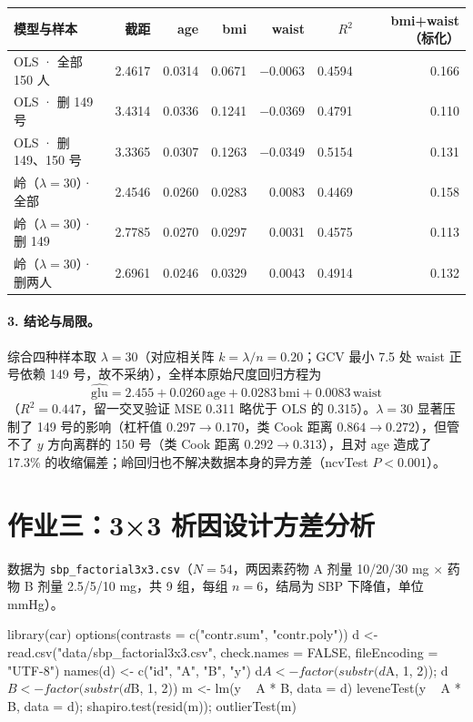 \vspace{0.8em}
\begin{tabular}{lrrrrrr}
\toprule
模型与样本 & 截距 & age & bmi & waist & $R^2$ & bmi+waist（标化）\\
\midrule
OLS · 全部 150 人     & 2.4617 & 0.0314 & 0.0671 & $-0.0063$ & 0.4594 & 0.166\\
OLS · 删 149 号       & 3.4314 & 0.0336 & 0.1241 & $-0.0369$ & 0.4791 & 0.110\\
OLS · 删 149、150 号  & 3.3365 & 0.0307 & 0.1263 & $-0.0349$ & 0.5154 & 0.131\\
\midrule
岭（$\lambda=30$）· 全部 & 2.4546 & 0.0260 & 0.0283 & 0.0083 & 0.4469 & 0.158\\
岭（$\lambda=30$）· 删 149 & 2.7785 & 0.0270 & 0.0297 & 0.0031 & 0.4575 & 0.113\\
岭（$\lambda=30$）· 删两人 & 2.6961 & 0.0246 & 0.0329 & 0.0043 & 0.4914 & 0.132\\
\bottomrule
\end{tabular}


\paragraph{3. 结论与局限。}综合四种样本取 $\lambda=30$（对应相关阵 $k=\lambda/n=0.20$；GCV 最小 7.5 处 waist 正号依赖 149 号，故不采纳），全样本原始尺度回归方程为
\[
\widehat{\text{glu}}=2.455+0.0260\,\text{age}+0.0283\,\text{bmi}+0.0083\,\text{waist}
\]
（$R^2=0.447$，留一交叉验证 MSE 0.311 略优于 OLS 的 0.315）。$\lambda=30$ 显著压制了 149 号的影响（杠杆值 $0.297\to 0.170$，类 Cook 距离 $0.864\to 0.272$），但管不了 $y$ 方向离群的 150 号（类 Cook 距离 $0.292\to 0.313$），且对 age 造成了 17.3\% 的收缩偏差；岭回归也不解决数据本身的异方差（ncvTest $P<0.001$）。

\section{作业三：3×3 析因设计方差分析}

数据为 \texttt{sbp\_factorial3x3.csv}（$N=54$，两因素药物 A 剂量 10/20/30 mg $\times$ 药物 B 剂量 2.5/5/10 mg，共 9 组，每组 $n=6$，结局为 SBP 下降值，单位 mmHg）。

\begin{rcode}
library(car)
options(contrasts = c("contr.sum", "contr.poly"))
d <- read.csv("data/sbp_factorial3x3.csv", check.names = FALSE, fileEncoding = "UTF-8")
names(d) <- c("id", "A", "B", "y")
d$A <- factor(substr(d$A, 1, 2)); d$B <- factor(substr(d$B, 1, 2))
m <- lm(y ~ A * B, data = d)
leveneTest(y ~ A * B, data = d); shapiro.test(resid(m)); outlierTest(m)
\end{rcode}


